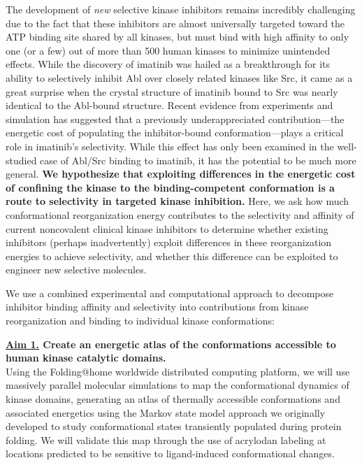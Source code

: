 \documentclass[11pt]{article}
\begin{document}
The development of \emph{new} selective kinase inhibitors remains incredibly challenging due to the fact that these inhibitors are almost universally targeted toward the ATP binding site shared by all kinases, but must bind with high affinity to only one (or a few) out of more than 500 human kinases to minimize unintended effects.
While the discovery of imatinib was hailed as a breakthrough for its ability to selectively inhibit Abl over closely related kinases like Src, it came as a great surprise when the crystal structure of imatinib bound to Src was nearly identical to the Abl-bound structure.
Recent evidence from  experiments and simulation has suggested that a previously underappreciated contribution---the energetic cost of populating the inhibitor-bound conformation---plays a critical role in imatinib's selectivity.
While this effect has only been examined in the well-studied case of Abl/Src binding to imatinib, it has the potential to be much more general. 
{\bf We hypothesize that exploiting differences in the energetic cost of confining the kinase to the binding-competent conformation is a route to selectivity in targeted kinase inhibition.}
Here, we ask how much conformational reorganization energy contributes to the selectivity and affinity of current noncovalent clinical kinase inhibitors to determine whether existing inhibitors (perhaps inadvertently) exploit differences in these reorganization energies to achieve selectivity, and whether this difference can be exploited to engineer new selective molecules.

We use a combined experimental and computational approach to decompose inhibitor binding affinity and selectivity into contributions from kinase reorganization and binding to individual kinase conformations:

{\bf \underline{Aim 1.} Create an energetic atlas of the conformations accessible to human kinase catalytic domains.}\\
Using the Folding@home worldwide distributed computing platform, we will use massively parallel molecular simulations to map the conformational dynamics of kinase domains, generating an atlas of thermally accessible conformations and associated energetics using the Markov state model approach we originally developed to study conformational states transiently populated during protein folding.
We will validate this map through the use of acrylodan labeling at locations predicted to be sensitive to ligand-induced conformational changes.
\end{document}
